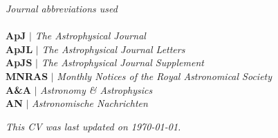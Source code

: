 \documentclass[11pt]{article}
\begin{document}
\vspace*{10mm}

\noindent \textit{Journal abbreviations used}\\ \\
\textbf{ApJ} $|$ \textit{The Astrophysical Journal}\\
\textbf{ApJL} $|$ \textit{The Astrophysical Journal Letters}\\
\textbf{ApJS} $|$ \textit{The Astrophysical Journal Supplement}\\
\textbf{MNRAS} $|$ \textit{Monthly Notices of the Royal Astronomical Society}\\
\textbf{A\&A} $|$ \textit{Astronomy \& Astrophysics}\\
\textbf{AN} $|$ \textit{Astronomische Nachrichten} \\



\vfill

\begin{center}
\noindent \textit{This CV was last updated on \today.}
\end{center}
\end{document}
